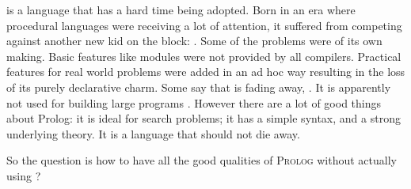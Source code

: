 \documentclass[proposal.tex]{subfiles}
\begin{document}
\begin{comment}
\par \progLang{Prolog} has a similar story. It was born in an era where procedural programming had made everyone notice their presence. Talking about 
competition, it was against something radical; the \progLang{C} programming language. The languages \progLang{C} has influenced is off the chart and 
so is the performance. It had paved the way for structured procedural programming and had given birth to the Unix operating system. Though the 
original version of \progLang{Prolog} has given rise to a large number of different flavours but a few drawbacks remain through the bloodline and as a 
result it did become the first choice. Some basic requirements such as modules are not provided by all compilers. To make it do real world stuff, a set of 
practical features are pushed in now and then which results in the loss of the purely declarative charm. The problem is that \progLang{Prolog} is fading 
away, \cite{website:prolog-steam,website:prolog-death,website:prolog-killer}, not many people use it and most of the times when it is used, the variant 
is usually \textit{practical} \progLang{Prolog} and the area being academia. It is not used for building large programs \cite{wikiprolog,somogyi1995
logic,website:prolog1000db}. But there are a lot of good things about \progLang{Prolog} that should not die away. Moreover, \progLang{Prolog} is ideal 
for search problems. 
\end{comment}

\par {} is a language that has a hard time being adopted. Born in an era where procedural languages were receiving a lot of 
attention, it suﬀered from competing against another new kid on the block: . Some of the problems were of its own making. Basic 
features like modules were not provided by all compilers. Practical features for real world problems were added in an ad hoc way resulting 
in the loss of its purely declarative charm. Some say that  is fading away, 
\cite{website:prolog-steam,website:prolog-death,website:prolog-killer}. It is apparently not used for building large programs 
\cite{wikiprolog,somogyi1995logic,website:prolog1000db}. However there are a lot of good things about Prolog: it is ideal for search 
problems; it has a simple syntax, and a strong underlying theory. It is a language that should not die away. 

\noindent So the question is how to have all the good qualities of \textsc{Prolog} without actually using ?  
\end{document}
